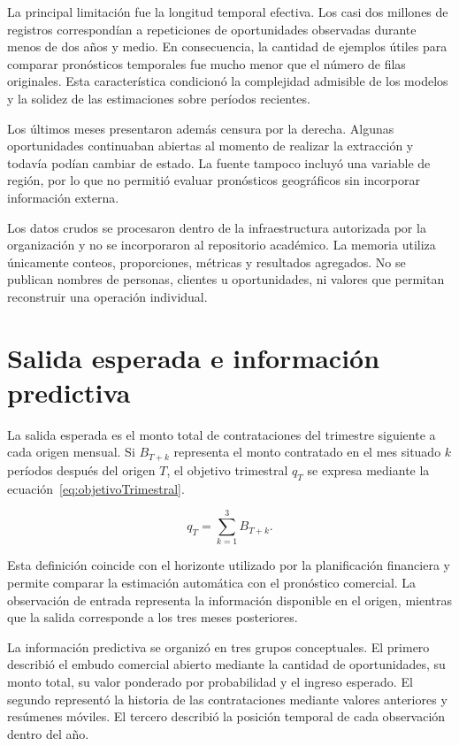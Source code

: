 La principal limitación fue la longitud temporal efectiva. Los casi dos millones de registros correspondían a repeticiones de oportunidades observadas durante menos de dos años y medio. En consecuencia, la cantidad de ejemplos útiles para comparar pronósticos temporales fue mucho menor que el número de filas originales. Esta característica condicionó la complejidad admisible de los modelos y la solidez de las estimaciones sobre períodos recientes.

Los últimos meses presentaron además censura por la derecha. Algunas oportunidades continuaban abiertas al momento de realizar la extracción y todavía podían cambiar de estado. La fuente tampoco incluyó una variable de región, por lo que no permitió evaluar pronósticos geográficos sin incorporar información externa.

Los datos crudos se procesaron dentro de la infraestructura autorizada por la organización y no se incorporaron al repositorio académico. La memoria utiliza únicamente conteos, proporciones, métricas y resultados agregados. No se publican nombres de personas, clientes u oportunidades, ni valores que permitan reconstruir una operación individual.

\section{Salida esperada e información predictiva}
\label{sec:salidaInformacion}

La salida esperada es el monto total de contrataciones del trimestre siguiente a cada origen mensual. Si $B_{T+k}$ representa el monto contratado en el mes situado $k$ períodos después del origen $T$, el objetivo trimestral $q_T$ se expresa mediante la ecuación~\ref{eq:objetivoTrimestral}.

\begin{equation}
    \label{eq:objetivoTrimestral}
    q_T = \sum_{k=1}^{3} B_{T+k}.
\end{equation}

Esta definición coincide con el horizonte utilizado por la planificación financiera y permite comparar la estimación automática con el pronóstico comercial. La observación de entrada representa la información disponible en el origen, mientras que la salida corresponde a los tres meses posteriores.

La información predictiva se organizó en tres grupos conceptuales. El primero describió el embudo comercial abierto mediante la cantidad de oportunidades, su monto total, su valor ponderado por probabilidad y el ingreso esperado. El segundo representó la historia de las contrataciones mediante valores anteriores y resúmenes móviles. El tercero describió la posición temporal de cada observación dentro del año.

